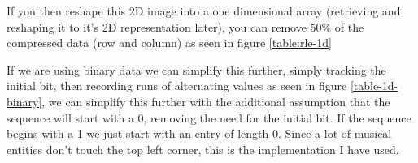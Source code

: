 If you then reshape this 2D image into a one dimensional array (retrieving and reshaping it to it's 2D representation later), you can remove 50\% of the compressed data (row and column) as seen in figure \ref{table:rle-1d}

If we are using binary data we can simplify this further, simply tracking the initial bit, then recording runs of alternating values as seen in figure \ref{table-1d-binary}, we can simplify this further with the additional assumption \parencite{fujinaga1996adaptive} that the sequence will start with a 0, removing the need for the initial bit. If the sequence begins with a 1 we just start with an entry of length 0. Since a lot of musical entities don't touch the top left corner, this is the implementation I have used.
